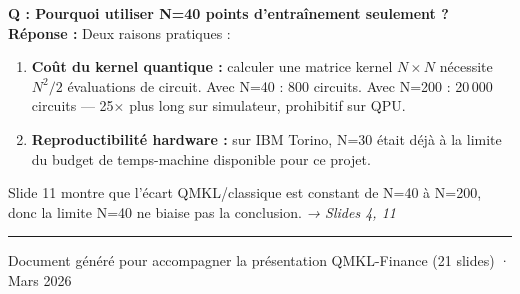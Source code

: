 \documentclass[12pt, a4paper]{article}
\begin{document}
\begin{question}
\textbf{Q : Pourquoi utiliser N=40 points d'entraînement seulement ?}\\[4pt]
\textbf{Réponse :} Deux raisons pratiques :
\begin{enumerate}
  \item \textbf{Coût du kernel quantique :} calculer une matrice kernel $N \times N$
        nécessite $N^2/2$ évaluations de circuit. Avec N=40 : 800 circuits.
        Avec N=200 : 20\,000 circuits — 25$\times$ plus long sur simulateur, prohibitif sur QPU.
  \item \textbf{Reproductibilité hardware :} sur IBM Torino, N=30 était déjà à la limite
        du budget de temps-machine disponible pour ce projet.
\end{enumerate}
Slide 11 montre que l'écart QMKL/classique est constant de N=40 à N=200,
donc la limite N=40 ne biaise pas la conclusion.
\hfill\textit{→ Slides 4, 11}
\end{question}

\vspace{24pt}
\hrule
\vspace{8pt}
\begin{center}
  \small\color{gray}
  Document généré pour accompagner la présentation QMKL-Finance (21 slides) · Mars 2026
\end{center}
\end{document}
